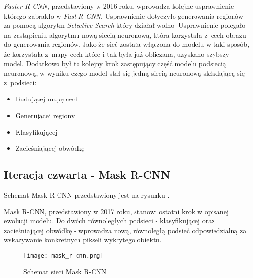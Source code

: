 
\textit{Faster R-CNN}, przedstawiony w 2016 roku, wprowadza kolejne usprawnienie którego zabrakło w \textit{Fast R-CNN}.
Usprawnienie dotyczyło generowania regionów za pomocą algorytm \textit{Selective Search} który działał wolno.
Usprawnienie polegało na zastąpieniu algorytmu nową siecią neuronową, która korzystała z~cech obrazu do generowania regionów.
Jako że sieć została włączona do modelu w taki sposób, że korzystała z~mapy cech które i tak była już obliczana, uzyskano szybszy model.
Dodatkowo był to kolejny krok zastępujący część modelu podsiecią neuronową, w wyniku czego model stał się jedną siecią neuronową składającą się z~podsieci:

\begin{itemize}
	\item Budującej mapę cech
	\item Generującej regiony
	\item Klasyfikującej
	\item Zacieśniającej obwódkę
\end{itemize}

\subsection{Iteracja czwarta - Mask R-CNN}

Schemat Mask R-CNN przedstawiony jest na rysunku .


Mask R-CNN, przedstawiony w 2017 roku, stanowi ostatni krok w opisanej ewolucji modelu.
Do dwóch równoległych podsieci - klasyfikującej oraz zacieśniającej obwódkę - wprowadza nową, równoległą podsieć odpowiedzialną za wskazywanie konkretnych pikseli wykrytego obiektu.

\begin{figure}[h]
  \centering
  \caption{Schemat sieci Mask R-CNN}
  \texttt{[image: mask\_r-cnn.png]}
  \label{fig:mask_r_cnn}
\end{figure}
